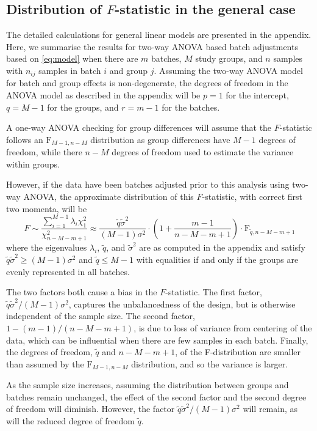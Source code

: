 \documentclass{bio}
\begin{document}
\subsection{Distribution of $F$-statistic in the general case}

The detailed calculations for general linear models are presented in the appendix. Here, we summarise the results for two-way ANOVA based batch adjustments based on \eqref{eq:model} when there are $m$ batches, $M$ study groups, and $n$ samples with $n_{ij}$ samples in batch $i$ and group $j$. Assuming the two-way ANOVA model for batch and group effects is non-degenerate, the degrees of freedom in the ANOVA model as described in the appendix will be $p=1$ for the intercept, $q=M-1$ for the groups, and $r=m-1$ for the batches.

A one-way ANOVA checking for group differences will assume that the $F$-statistic follows an $\text{F}_{M-1,n-M}$ distribution as group differences have $M-1$ degrees of freedom, while there $n-M$ degrees of freedom used to estimate the variance within groups.

However, if the data have been batches adjusted prior to this analysis using two-way ANOVA, the approximate distribution of this $F$-statistic, with correct first two momenta, will be
\begin{equation}
F\sim\frac{\sum_{i=1}^{M-1}\lambda_i\chi^2_{1}}{\chi^2_{n-M-m+1}}
\approx\frac{\tilde q\tilde\sigma^2}{(M-1)\sigma^2}\cdot\left(1+\frac{m-1}{n-M-m+1}\right)\cdot\text{F}_{\tilde q,n-M-m+1}
\end{equation}
where the eigenvalues $\lambda_i$, $\tilde q$, and $\tilde\sigma^2$ are as computed in the appendix and satisfy $\tilde q\tilde\sigma^2\ge (M-1)\sigma^2$ and $\tilde q\le M-1$ with equalities if and only if the groups are evenly represented in all batches.

The two factors both cause a bias in the $F$-statistic. The first factor, $\tilde q\tilde\sigma^2/(M-1)\sigma^2$, captures the unbalancedness of the design, but is otherwise independent of the sample size. The second factor, $1-(m-1)/(n-M-m+1)$, is due to loss of variance from centering of the data, which can be influential when there are few samples in each batch. Finally, the degrees of freedom, $\tilde q$ and $n-M-m+1$, of the F-distribution are smaller than assumed by the $\text{F}_{M-1,n-M}$ distribution, and so the variance is larger.

As the sample size increases, assuming the distribution between groups and batches remain unchanged, the effect of the second factor and the second degree of freedom will diminish. However, the factor $\tilde q\tilde\sigma^2/(M-1)\sigma^2$ will remain, as will the reduced degree of freedom $\tilde q$.
\end{document}
